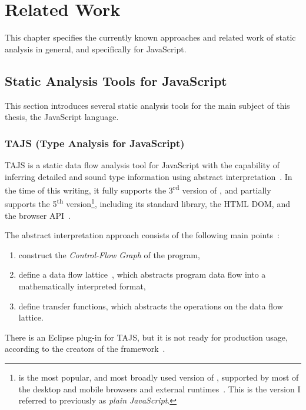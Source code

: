 \chapter{Related Work}
\label{chapter:relatedwork}

This chapter specifies the currently known approaches and related work of static analysis in general, and specifically for JavaScript.


\section{Static Analysis Tools for JavaScript}

This section introduces several static analysis tools for the main subject of this thesis, the JavaScript language.


\subsection{TAJS (Type Analysis for JavaScript)}

TAJS is a static data flow analysis tool for JavaScript with the capability of inferring detailed and sound type information using abstract interpretation~\cite{jensen2009type}. In the time of this writing, it fully supports the 3\textsuperscript{rd} version of \es, and partially supports the 5\textsuperscript{th} version\footnote{ is the most popular, and most broadly used version of \es, supported by most of the desktop and mobile browsers and external runtimes~\cite{kangax-es5}. This is the \es version I referred to previously as \emph{plain JavaScript}.}, including its standard library, the HTML DOM, and the browser API~\cite{tajs-github}.

The abstract interpretation approach consists of the following main points~\cite{tajs-presentation}:

\begin{enumerate}
\item construct the \emph{Control-Flow Graph} of the program,
\item define a data flow lattice~\cite{jensen2009type}, which abstracts program data flow into a mathematically interpreted format,
\item define transfer functions, which abstracts the operations on the data flow lattice.
\end{enumerate}

There is an Eclipse plug-in for TAJS, but it is not ready for production usage, according to the creators of the framework~\cite{tajs-website}.


